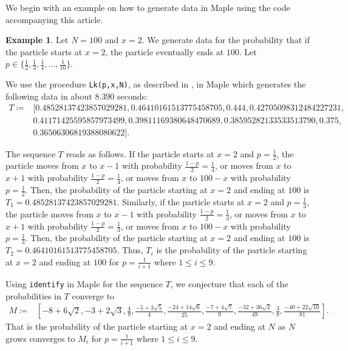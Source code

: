 \documentclass[reqno]{amsart}
\theoremstyle{definition}
\newtheorem{example}{Example}
\theoremstyle{definition}
\theoremstyle{remark}
\begin{document}
\noindent We begin with an example on how to generate data in Maple using the code accompanying this article.

\begin{example}\label{ex: x=1 prob}
Let $N=100$ and $x=2$. We generate data for the probability that if the particle starts at $x=2$, the particle eventually ends at $100$. Let $p\in \{\frac{1}{2},\frac{1}{3},\frac{1}{4},\ldots, \frac{1}{10}\}$. 

We use the procedure \texttt{Lk(p,x,N)}, as described in , in Maple which generates the following data in about $8.390$ seconds:
\begin{align*}
    T \coloneqq &[0.48528137423857029281, 0.46410161513775458705, 0.444, 0.42705098312484227231,\\ &0.41171425595857973499, 0.39811169380648470689, 0.38595282133533513790, 0.375, \\
    &0.36506306819388080622].
\end{align*}

\noindent The sequence $T$ reads as follows. If the particle starts at $x=2$ and $p=\frac{1}{2}$, the particle moves from $x$ to $x-1$ with probability $\frac{1-p}{2}=\frac{1}{4}$, or moves from $x$ to $x+1$ with probability $\frac{1-p}{2}=\frac{1}{4}$, or moves from $x$ to $100-x$ with probability $p=\frac{1}{2}$. Then, the probability of the particle starting at $x=2$ and ending at $100$ is $T_1=0.48528137423857029281$. Similarly, if the particle starts at $x=2$ and $p=\frac{1}{3}$, the particle moves from $x$ to $x-1$ with probability $\frac{1-p}{2}=\frac{1}{3}$, or moves from $x$ to $x+1$ with probability $\frac{1-p}{2}=\frac{1}{3}$, or moves from $x$ to $100-x$ with probability $p=\frac{1}{3}$. Then, the probability of the particle starting at $x=2$ and ending at $100$ is $T_2=0.46410161513775458705$. Thus, $T_i$ is the probability of the particle starting at $x=2$ and ending at $100$ for $p=\frac{1}{i+1}$ where $1\leq i\leq 9$.

Using \texttt{identify} in Maple for the sequence $T$, we conjecture that each of the probabilities in $T$ converge to  
\begin{align*}
    M\coloneqq&\left[-8+6 \sqrt{2}, -3+2 \sqrt{3}, \frac{4}{9}, 
\frac{-5+3 \sqrt{5}}{4}, 
\frac{-24 + 14\sqrt{6}}{25}, 
\frac{-7+4 \sqrt{7}}{9}, 
\frac{-32+36 \sqrt{2}}{49}, {\frac{3}{8}}, 
\frac{-40+22 \sqrt{10}}{81}\right].
\end{align*}
That is the probability of the particle starting at $x=2$ and ending at $N$ as $N$ grows converges to $M_i$ for $p=\frac{1}{i+1}$ where $1\leq i\leq 9$.
\end{example}
\end{document}

